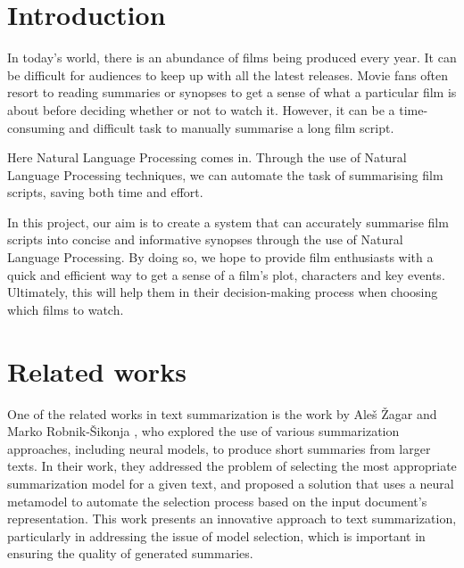 \documentclass[fleqn,moreauthors,10pt]{ds_report}
\affiliation{\textit{Advisors: Slavko Žitnik}}
\begin{document}
\flushbottom 

\maketitle 

\thispagestyle{empty} 


\section*{Introduction}

In today's world, there is an abundance of films being produced every year. It can be difficult for audiences to keep up with all the latest releases. Movie fans often resort to reading summaries or synopses to get a sense of what a particular film is about before deciding whether or not to watch it. However, it can be a time-consuming and difficult task to manually summarise a long film script.

Here Natural Language Processing comes in. Through the use of Natural Language Processing techniques, we can automate the task of summarising film scripts, saving both time and effort.

In this project, our aim is to create a system that can accurately summarise film scripts into concise and informative synopses through the use of Natural Language Processing. By doing so, we hope to provide film enthusiasts with a quick and efficient way to get a sense of a film's plot, characters and key events. Ultimately, this will help them in their decision-making process when choosing which films to watch.


\section*{Related works}

One of the related works in text summarization is the work by Aleš Žagar and Marko  Robnik-Šikonja \cite{zagar2022}, who explored the use of various summarization approaches, including neural models, to produce short summaries from larger texts. In their work, they addressed the problem of selecting the most appropriate summarization model for a given text, and proposed a solution that uses a neural metamodel to automate the selection process based on the input document's representation. This work presents an innovative approach to text summarization, particularly in addressing the issue of model selection, which is important in ensuring the quality of generated summaries.
\end{document}

